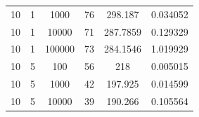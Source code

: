 \documentclass[11pt,a4paper]{report}
\begin{document}
\begin{table}[H]
{\begin{tabular}{c|c|c|c|c|c}
10                                                                                   & 1                                                                                      & 1000                                                                      & 76                                                                                        & 298.187                                                                   & 0.034052              \\
10                                                                                   & 1                                                                                      & 10000                                                                     & 71                                                                                        & 287.7859                                                                  & 0.129329              \\
10                                                                                   & 1                                                                                      & 100000                                                                    & 73                                                                                        & 284.1546                                                                  & 1.019929              \\ \hline
10                                                                                   & 5                                                                                      & 100                                                                       & 56                                                                                        & 218                                                                       & 0.005015              \\
10                                                                                   & 5                                                                                      & 1000                                                                      & 42                                                                                        & 197.925                                                                   & 0.014599              \\
10                                                                                   & 5                                                                                      & 10000                                                                     & 39                                                                                        & 190.266                                                                   & 0.105564              \\

\end{tabular}}
\end{table}
\end{document}
